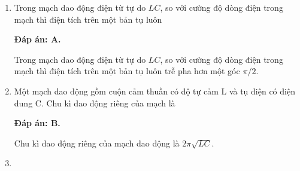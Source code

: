 \begin{enumerate}[label=\bfseries Câu \arabic*:]
{	}	
	
	\item {}
	
	{Trong mạch dao động điện từ tự do $LC$, so với cường độ dòng điện trong mạch thì điện tích trên một bản tụ luôn
	}
	
	\hideall
	{		\textbf{Đáp án: A.}
		
		Trong mạch dao động điện từ tự do $LC$, so với cường độ dòng điện trong mạch thì điện tích trên một bản tụ luôn trễ pha hơn một góc $\pi/2$.
		
	}
	
	\item {}
	
	{Một mạch dao động gồm cuộn cảm thuần có độ tự cảm L và tụ điện có điện dung C. Chu kì dao động riêng của mạch là
	}
	
	\hideall
	{		\textbf{Đáp án: B.}
		
		Chu kì dao động riêng của mạch dao động là $2\pi \sqrt{LC}$.
		
	}	
	
	\item {}
	

\end{enumerate}
